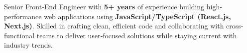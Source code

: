 

\begin{cvparagraph}

    Senior Front‐End Engineer with \textbf{5+ years} of experience building high‐performance web applications using \textbf{JavaScript/TypeScript (React.js, Next.js)}. Skilled in crafting clean, efficient code and collaborating with cross‐functional teams to deliver user‐focused solutions while staying current with industry trends.
\end{cvparagraph}
